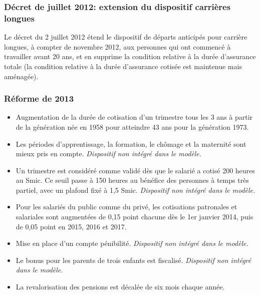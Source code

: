 \subsubsection{Décret de juillet 2012: extension du dispositif carrières longues}

Le décret du 2 juillet 2012 étend le dispositif de départs anticipés pour carrière longues, à compter de novembre 2012, aux personnes qui ont commencé à travailler avant 20 ans, et en supprime la condition relative à la durée d'assurance totale (la condition relative à la durée d'assurance cotisée est maintenue mais aménagée).

\subsubsection{Réforme de 2013}
\begin{itemize}
   \item Augmentation de la durée de cotisation d'un trimestre tous les 3 ans à partir de la génération née en 1958 pour atteindre 43 ans pour la génération 1973.
   \item Les périodes d'apprentissage, la formation, le chômage et la maternité sont mieux pris en compte. \textit{Dispositif non intégré dans le modèle.}
   \item Un trimestre est considéré comme validé dès que le salarié a cotisé 200 heures au Smic. Ce seuil passe à 150 heures au bénéfice des personnes à temps très partiel, avec un plafond fixé à 1,5 Smic. \textit{Dispositif non intégré dans le modèle.}
   \item Pour les salariés du public comme du privé, les cotisations patronales et salariales sont augmentées de 0,15 point chacune dès le 1er janvier 2014, puis de 0,05 point en 2015, 2016 et 2017.
   \item Mise en place d'un compte pénibilité. \textit{Dispositif non intégré dans le modèle.}
   \item Le bonus pour les parents de trois enfants est fiscalisé. \textit{Dispositif non intégré dans le modèle.}
   \item La revalorisation des pensions est décalée de six mois chaque année.

\end{itemize}
